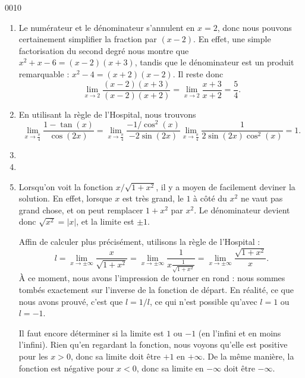 \begin{corrige}{0010}

\begin{enumerate}

\item
Le numérateur et le dénominateur s'annulent en $x=2$, donc nous pouvons certainement simplifier la fraction par $(x-2)$. En effet, une simple factorisation du second degré nous montre que $x^2+x-6=(x-2)(x+3)$, tandis que le dénominateur est un produit remarquable : $x^2-4=(x+2)(x-2)$. Il reste donc
\begin{equation}
	\lim_{x\to 2} \frac{ (x-2)(x+3) }{ (x-2)(x+2) }=\lim_{x\to 2} \frac{ x+3 }{ x+2 }=\frac{ 5 }{ 4 }.
\end{equation}

\item
En utilisant la règle de l'Hospital, nous trouvons
\begin{equation}
	\lim_{x\to \frac{ \pi }{ 4 }} \frac{ 1-\tan(x) }{ \cos(2x) }=\lim_{x\to \frac{ \pi }{ 4 }} \frac{ -1/\cos^2(x) }{ -2\sin(2x) }\lim_{x\to \frac{ \pi }{ 4 }} \frac{ 1 }{ 2\sin(2x)\cos^2(x) }=1.
\end{equation}

\item
\item
\item
Lorsqu'on voit la fonction $x/\sqrt{1+x^2}$, il y a moyen de facilement deviner la solution. En effet, lorsque $x$ est très grand, le $1$ à côté du $x^2$ ne vaut pas grand chose, et on peut remplacer $1+x^2$ par $x^2$. Le dénominateur devient donc $\sqrt{x^2}=| x |$, et la limite est $\pm 1$.

Affin de calculer plus précisément, utilisons la règle de l'Hospital :
\begin{equation}
	l=\lim_{x\to \pm\infty} \frac{ x }{ \sqrt{1+x^2} }=\lim_{x\to \pm\infty} \frac{1}{ x\frac{ 1 }{ \sqrt{1+x^2} } }=\lim_{x\to \pm\infty} \frac{ \sqrt{1+x^2} }{ x }.
\end{equation}
À ce moment, nous avons l'impression de tourner en rond : nous sommes tombés exactement sur l'inverse de la fonction de départ. En réalité, ce que nous avons prouvé, c'est que $l=1/l$, ce qui n'est possible qu'avec $l=1$ ou $l=-1$.

Il faut encore déterminer si la limite est $1$ ou $-1$ (en l'infini et en moins l'infini). Rien qu'en regardant la fonction, nous voyons qu'elle est positive pour les $x>0$, donc sa limite doit être $+1$ en $+\infty$. De la même manière, la fonction est négative pour $x<0$, donc sa limite en $-\infty$ doit être $-\infty$.


\end{enumerate}
\end{corrige}
